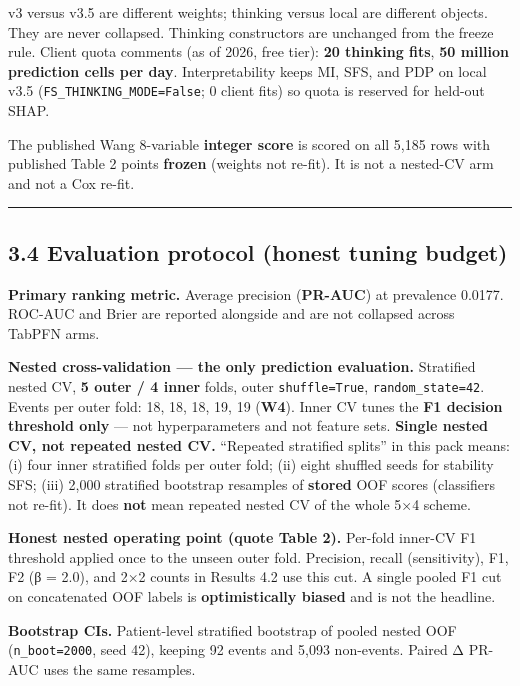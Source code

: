 \documentclass[
]{article}
\begin{document}
v3 versus v3.5 are different weights; thinking versus local are
different objects. They are never collapsed. Thinking constructors are
unchanged from the freeze rule. Client quota comments (as of 2026, free
tier): \textbf{20 thinking fits}, \textbf{50 million prediction cells
per day}. Interpretability keeps MI, SFS, and PDP on local v3.5
(\texttt{FS\_THINKING\_MODE=False}; 0 client fits) so quota is reserved
for held-out SHAP.

The published Wang 8-variable \textbf{integer score} is scored on all
5,185 rows with published Table 2 points \textbf{frozen} (weights not
re-fit). It is not a nested-CV arm and not a Cox re-fit.

\begin{center}\rule{0.5\linewidth}{0.5pt}\end{center}

\subsection{3.4 Evaluation protocol (honest tuning
budget)}\label{evaluation-protocol-honest-tuning-budget}

\textbf{Primary ranking metric.} Average precision (\textbf{PR-AUC}) at
prevalence 0.0177. ROC-AUC and Brier are reported alongside and are not
collapsed across TabPFN arms.

\textbf{Nested cross-validation --- the only prediction evaluation.}
Stratified nested CV, \textbf{5 outer / 4 inner} folds, outer
\texttt{shuffle=True}, \texttt{random\_state=42}. Events per outer fold:
18, 18, 18, 19, 19 (\textbf{W4}). Inner CV tunes the \textbf{F1 decision
threshold only} --- not hyperparameters and not feature sets.
\textbf{Single nested CV, not repeated nested CV.} ``Repeated stratified
splits'' in this pack means: (i) four inner stratified folds per outer
fold; (ii) eight shuffled seeds for stability SFS; (iii) 2,000
stratified bootstrap resamples of \textbf{stored} OOF scores
(classifiers not re-fit). It does \textbf{not} mean repeated nested CV
of the whole 5×4 scheme.

\textbf{Honest nested operating point (quote Table 2).} Per-fold
inner-CV F1 threshold applied once to the unseen outer fold. Precision,
recall (sensitivity), F1, F2 (β = 2.0), and 2×2 counts in Results 4.2
use this cut. A single pooled F1 cut on concatenated OOF labels is
\textbf{optimistically biased} and is not the headline.

\textbf{Bootstrap CIs.} Patient-level stratified bootstrap of pooled
nested OOF (\texttt{n\_boot=2000}, seed 42), keeping 92 events and 5,093
non-events. Paired Δ PR-AUC uses the same resamples.
\end{document}
